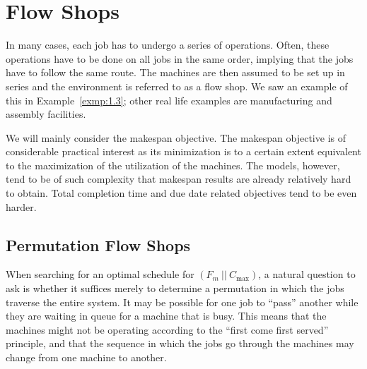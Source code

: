 \section{Flow Shops} \label{sec:7}
In many cases, each job has to undergo a series of operations. 
Often, these operations have to be done on all jobs in the same
order, implying that the jobs have to follow the same route.
The machines are then assumed to be set up in series and the environment 
is referred to as a flow shop. We saw an example of this in 
Example~\ref{exmp:1.3}; other real life examples are manufacturing and 
assembly facilities. 

We will mainly consider the makespan objective. The makespan objective is of 
considerable practical interest as its minimization is to a certain extent 
equivalent to the maximization of the utilization of the
machines. The models, however, tend to be of such complexity that makespan
results are already relatively hard to obtain. Total completion time and due
date related objectives tend to be even harder.

\subsection{Permutation Flow Shops} \label{subsec:7.1}
When searching for an optimal schedule for $(F_m~||~C_{\max})$, 
a natural question to ask is whether it suffices merely to determine 
a permutation in which the jobs traverse the entire system. 
It may be possible for one job to ``pass'' another while they are 
waiting in queue for a machine that is busy. This means that the 
machines might not be operating according to the ``first come first 
served'' principle, and that the sequence in which the jobs go through the 
machines may change from one machine to another. 

